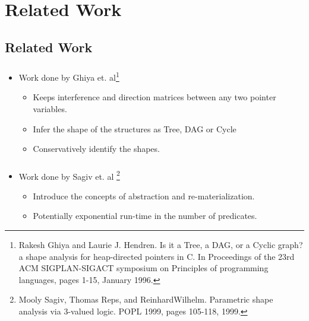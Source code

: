 \documentclass[mathserif,10pt]{beamer}
\newcommand{\cmt}[1]{}
\begin{document}
{\section{Related Work}
\subsection{Related Work}
\frame
{
	\frametitle{\subsecname}
	\begin{itemize}
	\item Work done by Ghiya et. al\footnote{Rakesh Ghiya and Laurie J. Hendren. Is it a Tree, a DAG, or a Cyclic graph? 
	a shape analysis for heap-directed pointers in C. In Proceedings of the 23rd ACM
	SIGPLAN-SIGACT symposium on Principles of programming languages, pages 1-15, January 1996.}
	
	\begin{itemize}
	\item Keeps interference and direction matrices between any two 
			pointer variables.
	\item Infer the shape of the structures as Tree, DAG or Cycle
	\item Conservatively identify the shapes.
	\end{itemize}
	\end{itemize}
}
\frame
{
	\frametitle{\subsecname}
	\begin{itemize}
	\item Work done by Sagiv et. al \footnote{Mooly Sagiv, Thomas Reps, and ReinhardWilhelm. Parametric shape analysis via
	3-valued logic. POPL 1999, pages 105-118, 1999.}
	
	\begin{itemize}
	\item Introduce the concepts of abstraction and re-materialization.
	\item Potentially exponential run-time in the number of predicates.
	\end{itemize}
	\end{itemize}
		
}
\cmt{
\frame
{
	\frametitle{\subsecname}
	\begin{itemize}
	\item Work done by Marron et. al \footnote{Mark Marron, Deepak Kapur, Darko Stefanovic, and Manuel Hermenegildo. A
static heap analysis for shape and connectivity: unified memory analysis: the base
framework. LCPC'06, pages 345-363, 2006.}
	
	\begin{itemize}
	\item Presents a data flow framework that uses heap graphs to model data flow values.
	\item The analysis uses technique similar to re-materialization, but the re-materialization is approximate and 
	may result in loss of precision.
	\end{itemize}
	\end{itemize}
		
}}}
\end{document}
